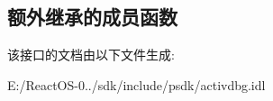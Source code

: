 \subsection*{额外继承的成员函数}


该接口的文档由以下文件生成\+:\begin{DoxyCompactItemize}
\item 
E\+:/\+React\+O\+S-\/0../sdk/include/psdk/activdbg.\+idl\end{DoxyCompactItemize}
